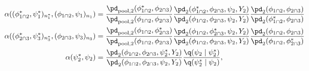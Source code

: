 \begin{align}
  \alpha((\phi_{1 \cap 2}^{*}, \psi_{1}^{*})_{n_{1}^{*}}, (\phi_{1 \cap 2}, \psi_{1})_{n_{1}}) &=
    \frac {
      \pd_{\text{pool}, 2}(\phi_{1 \cap 2}^{*}, \phi_{2 \cap 3})
    } {
      \pd_{\text{pool}, 2}(\phi_{1 \cap 2}, \phi_{2 \cap 3})
    }
    \frac {
      \pd_{2}(\phi_{1 \cap 2}^{*}, \phi_{2 \cap 3}, \psi_{2}, Y_{2})
    } {
      \pd_{2}(\phi_{1 \cap 2}, \phi_{2 \cap 3}, \psi_{2}, Y_{2})
    }
    \frac {
      \pd_{2} (\phi_{1 \cap 2}, \phi_{2 \cap 3})
    } {
      \pd_{2} (\phi_{1 \cap 2}^{*}, \phi_{2 \cap 3})
    }
  \\
  \alpha((\phi_{2 \cap 3}^{*}, \psi_{3}^{*})_{n_{3}^{*}}, (\phi_{2 \cap 3}, \psi_{3})_{n_{3}}) &=
    \frac {
      \pd_{\text{pool}, 2}(\phi_{1 \cap 2}, \phi_{2 \cap 3}^{*})
    } {
      \pd_{\text{pool}, 2}(\phi_{1 \cap 2}, \phi_{2 \cap 3})
    }
    \frac {
      \pd_{2}(\phi_{1 \cap 2}, \phi_{2 \cap 3}^{*}, \psi_{2}, Y_{2})
    } {
      \pd_{2}(\phi_{1 \cap 2}, \phi_{2 \cap 3}, \psi_{2}, Y_{2})
    }
    \frac {
      \pd_{2} (\phi_{1 \cap 2}, \phi_{2 \cap 3})
    } {
      \pd_{2} (\phi_{1 \cap 2}, \phi_{2 \cap 3}^{*})
    }
  \\
  \alpha(\psi_{2}^{*}, \psi_{2}) &=
    \frac {
      \pd_{2}(\phi_{1 \cap 2}, \phi_{2 \cap 3}, \psi_{2}^{*}, Y_{2})
    } {
      \pd_{2}(\phi_{1 \cap 2}, \phi_{2 \cap 3}, \psi_{2}, Y_{2})
    }
    \frac {
      \q(\psi_{2} \mid \psi_{2}^{*})
    } {
      \q(\psi_{2}^{*} \mid \psi_{2})
    },
  \label{eqn:stage-two-acceptance}
\end{align}